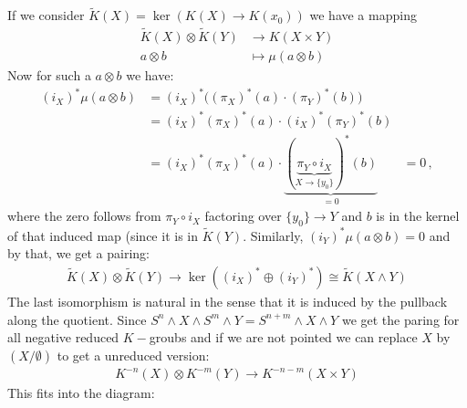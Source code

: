 \begin{definition}
	If we consider $\tilde{K}(X)=\ker(K(X)\to K(x_0))$ we have a mapping 
	\begin{align*}
		\tilde{K}(X)\otimes \tilde{K}(Y)&\to K(X\times Y)\\
		a\otimes b                      & \mapsto \mu(a\otimes b)
	\end{align*} Now for such a $a\otimes b$ we have: 
	\begin{align*}
		(i_X)^*\mu(a\otimes b)&=(i_X)^*\Big((\pi_X)^*(a)\cdot (\pi_Y)^*(b)\Big)&\\
		&= (i_X)^*(\pi_X)^*(a) \cdot (i_X)^*(\pi_Y)^*(b)& \\
		&=(i_X)^*(\pi_X)^*(a) \cdot \underbrace{(\underbrace{\pi_Y\circ i_X}_{X\to \{y_0\} })^*(b) }_{=0} &=0\, ,
	\end{align*}where the zero follows from $\pi_Y\circ i_X$ factoring over $\{y_0\}\to Y$ and $b$ is in the kernel of that induced map (since it is in $\tilde{K}(Y)$. Similarly, $(i_Y)^*\mu(a\otimes b)=0$ and by that, we get a pairing: 
	\begin{align*}
		\tilde{K}(X)\otimes \tilde{K}(Y)\to \ker((i_X)^*\oplus (i_Y)^*)\cong \tilde{K}(X\wedge Y)
	\end{align*} The last isomorphism is natural in the sense that it is induced by the pullback along the quotient. Since $S^n\wedge X\wedge S^m\wedge Y=S^{n+m}\wedge X\wedge Y$ we get the paring for all negative reduced $K-$groubs and if we are not pointed we can replace $X$ by $(X\slash \emptyset)$ to get a unreduced version:
	\begin{align*}
		K^{-n}(X)\otimes K^{-m}(Y)\to K^{-n-m}(X\times Y)
	\end{align*} This fits into the diagram: 
\end{definition}
\begin{corollary}
	
\end{corollary}